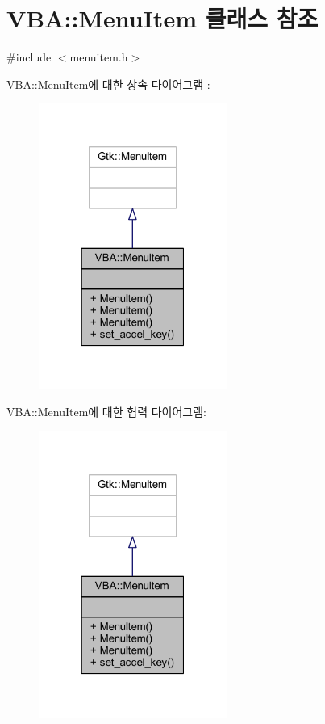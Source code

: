 \hypertarget{class_v_b_a_1_1_menu_item}{}\section{V\+BA\+:\+:Menu\+Item 클래스 참조}
\label{class_v_b_a_1_1_menu_item}


{\ttfamily \#include $<$menuitem.\+h$>$}



V\+BA\+:\+:Menu\+Item에 대한 상속 다이어그램 \+: \nopagebreak
\begin{figure}[H]
\begin{center}
\leavevmode
\includegraphics[width=175pt]{class_v_b_a_1_1_menu_item__inherit__graph}
\end{center}
\end{figure}


V\+BA\+:\+:Menu\+Item에 대한 협력 다이어그램\+:\nopagebreak
\begin{figure}[H]
\begin{center}
\leavevmode
\includegraphics[width=175pt]{class_v_b_a_1_1_menu_item__coll__graph}
\end{center}
\end{figure}

